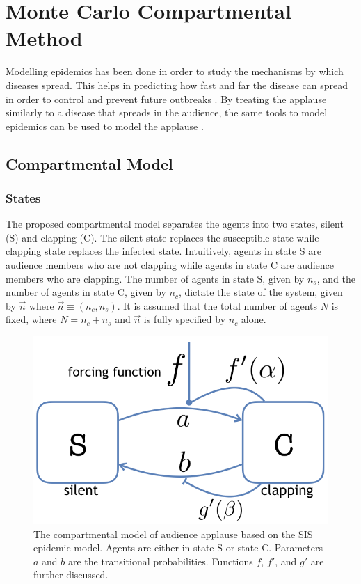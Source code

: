 \chapter{Monte Carlo Compartmental Method}
\label{chap2}

\hspace{\parindent} Modelling epidemics has been done in order to study the mechanisms by which diseases spread. This helps in predicting how fast and far the disease can spread in order to control and prevent future outbreaks \cite{Arino453}. By treating the applause similarly to a disease that spreads in the audience, the same tools to model epidemics can be used to model the applause \cite{Mann20130466}. 

\section{Compartmental Model}
\subsection{States}

\hspace{\parindent}The proposed compartmental model separates the agents into two states, silent (S) and clapping (C). 
The silent state replaces the susceptible state while clapping state replaces the infected state. 
Intuitively, agents in state S are audience members who are not clapping while agents in state C are audience members who are clapping.
The number of agents in state S, given by $n_{s}$, and the number of agents in state C, given by $n_{c}$, dictate the state of the system, given by $\vec{n}$ where $\vec{n}\equiv(n_{c},n_{s})$.
It is assumed that the total number of agents $N$ is fixed, where $N = n_{c} + n_{s}$ and $\vec{n}$ is fully specified by $n_{c}$ alone.

\begin{figure}
 \centering
  \includegraphics[width=0.5\linewidth]{images/chapter2/model2.png}
  \caption{The compartmental model of audience applause based on the SIS epidemic model. Agents are either in state S or state C. Parameters $a$ and $b$ are the transitional probabilities. Functions $f$, $f'$, and $g'$ are further discussed.}
  \label{fig:SCSmodel}
\end{figure}

